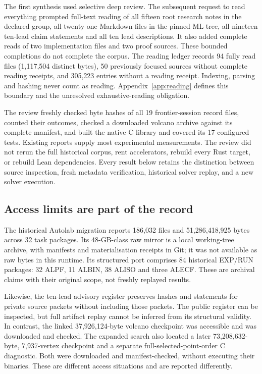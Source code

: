 The first synthesis used selective deep review. The subsequent request to
read everything prompted full-text reading of all fifteen root research
notes in the declared group, all twenty-one Markdown files in the pinned
ML tree, all nineteen ten-lead claim statements and all ten lead
descriptions. It also added complete reads of two implementation files and
two proof sources. These bounded completions do not complete the corpus.
The reading ledger records 94 fully read files (1,117,504 distinct bytes),
50 previously focused sources without complete reading receipts, and
305,223 entries without a reading receipt. Indexing, parsing and hashing
never count as reading. Appendix~\ref{app:reading} defines this boundary
and the unresolved exhaustive-reading obligation.

The review freshly checked byte hashes of all 19 frontier-session record
files, counted their outcomes, checked a downloaded volcano archive against
its complete manifest, and built the native C library and covered its
17 configured tests. Existing reports supply most experimental
measurements. The review did not rerun the full historical corpus, rent
accelerators, rebuild every Rust target, or rebuild Lean dependencies.
Every result below retains the distinction between source inspection,
fresh metadata verification, historical solver replay, and a new solver
execution.

\subsection{Access limits are part of the record}

The historical Autolab migration reports 186,032 files and
51,286,418,925 bytes across 32 task packages. Its 48-GB-class raw mirror is
a local working-tree archive, with manifests and materialisation receipts
in Git; it was not available as raw bytes in this runtime. Its structured
port comprises 84 historical EXP/RUN packages: 32 ALPF, 11 ALBIN, 38 ALISO
and three ALECF. These are archival claims with their original scope, not
freshly replayed results.

Likewise, the ten-lead advisory register preserves hashes and statements
for private source packets without including those packets. The public
register can be inspected, but full artifact replay cannot be inferred
from its structural validity. In contrast, the linked 37,926,124-byte
volcano checkpoint was accessible and was downloaded and checked. The
expanded search also located a later 73,208,632-byte, 7,937-vertex
checkpoint and a separate full-selected-point-order C diagnostic. Both
were downloaded and manifest-checked, without executing their binaries. These
are different access situations and are reported differently.

